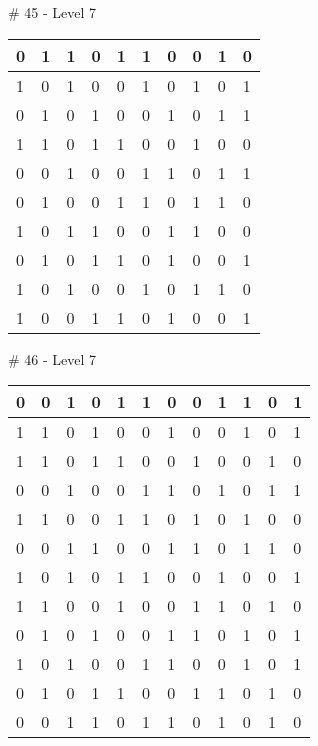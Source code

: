 \smallskip

\# 45 - Level 7 \newline
\begin{tabular}{|m{\collen}|m{\collen}|m{\collen}|m{\collen}|m{\collen}|m{\collen}|m{\collen}|m{\collen}|m{\collen}|m{\collen}|}
\hline
  0 & 1 & 1 & 0 & 1 & 1 & 0 & 0 & 1 & 0 \\
\hline
  1 & 0 & 1 & 0 & 0 & 1 & 0 & 1 & 0 & 1 \\
\hline
  0 & 1 & 0 & 1 & 0 & 0 & 1 & 0 & 1 & 1 \\
\hline
  1 & 1 & 0 & 1 & 1 & 0 & 0 & 1 & 0 & 0 \\
\hline
  0 & 0 & 1 & 0 & 0 & 1 & 1 & 0 & 1 & 1 \\
\hline
  0 & 1 & 0 & 0 & 1 & 1 & 0 & 1 & 1 & 0 \\
\hline
  1 & 0 & 1 & 1 & 0 & 0 & 1 & 1 & 0 & 0 \\
\hline
  0 & 1 & 0 & 1 & 1 & 0 & 1 & 0 & 0 & 1 \\
\hline
  1 & 0 & 1 & 0 & 0 & 1 & 0 & 1 & 1 & 0 \\
\hline
  1 & 0 & 0 & 1 & 1 & 0 & 1 & 0 & 0 & 1 \\
\hline
\end{tabular}


\smallskip

\# 46 - Level 7 \newline
\begin{tabular}{|m{\collen}|m{\collen}|m{\collen}|m{\collen}|m{\collen}|m{\collen}|m{\collen}|m{\collen}|m{\collen}|m{\collen}|m{\collen}|m{\collen}|}
\hline
  0 & 0 & 1 & 0 & 1 & 1 & 0 & 0 & 1 & 1 & 0 & 1 \\
\hline
  1 & 1 & 0 & 1 & 0 & 0 & 1 & 0 & 0 & 1 & 0 & 1 \\
\hline
  1 & 1 & 0 & 1 & 1 & 0 & 0 & 1 & 0 & 0 & 1 & 0 \\
\hline
  0 & 0 & 1 & 0 & 0 & 1 & 1 & 0 & 1 & 0 & 1 & 1 \\
\hline
  1 & 1 & 0 & 0 & 1 & 1 & 0 & 1 & 0 & 1 & 0 & 0 \\
\hline
  0 & 0 & 1 & 1 & 0 & 0 & 1 & 1 & 0 & 1 & 1 & 0 \\
\hline
  1 & 0 & 1 & 0 & 1 & 1 & 0 & 0 & 1 & 0 & 0 & 1 \\
\hline
  1 & 1 & 0 & 0 & 1 & 0 & 0 & 1 & 1 & 0 & 1 & 0 \\
\hline
  0 & 1 & 0 & 1 & 0 & 0 & 1 & 1 & 0 & 1 & 0 & 1 \\
\hline
  1 & 0 & 1 & 0 & 0 & 1 & 1 & 0 & 0 & 1 & 0 & 1 \\
\hline
  0 & 1 & 0 & 1 & 1 & 0 & 0 & 1 & 1 & 0 & 1 & 0 \\
\hline
  0 & 0 & 1 & 1 & 0 & 1 & 1 & 0 & 1 & 0 & 1 & 0 \\
\hline
\end{tabular}


\smallskip

